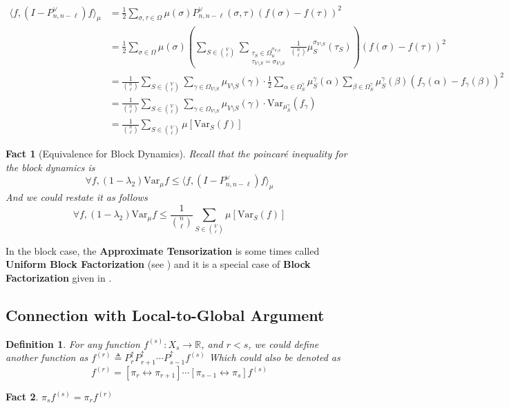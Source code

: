 \documentclass{article}
\newtheorem{define}{Definition}[section]
\newtheorem{fact}{Fact}[section]
\def\<{\langle}
\def\>{\rangle}
\def\Var{\mathrm{Var}}
\begin{document}
\begin{align*}
  \<f, (I - P^{\lor}_{n,n-\ell})f\>_\mu
  &= \frac{1}{2} \sum_{\sigma, \tau \in\Omega} \mu(\sigma)P^\lor_{n,n-\ell}(\sigma, \tau)\left(f(\sigma) - f(\tau)\right)^2 \\
  &= \frac{1}{2} \sum_{\sigma\in\Omega} \mu(\sigma) \left(\sum_{S \in \binom{V}{\ell}} \sum_{\substack{\tau_S\in\Omega^{\sigma_{V\setminus S}}_u \\ \tau_{V\setminus S} = \sigma_{V\setminus S}}} \frac{1}{\binom{n}{\ell}} \mu^{\sigma_{V\setminus S}}_S(\tau_S)\right)\left(f(\sigma) - f(\tau)\right)^2 \\
  &= \frac{1}{\binom{n}{\ell}} \sum_{S\in \binom{V}{\ell}} \sum_{\gamma\in \Omega_{V\setminus S}} \mu_{V\setminus S} (\gamma) \cdot \frac{1}{2} \sum_{\alpha\in \Omega^{\gamma}_S} \mu^\gamma_S(\alpha) \sum_{\beta\in\Omega^\gamma_S}\mu^\gamma_S(\beta) (f_\gamma(\alpha) - f_\gamma(\beta))^2 \\
  &= \frac{1}{\binom{n}{\ell}}\sum_{S\in \binom{V}{\ell}} \sum_{\gamma\in\Omega_{V\setminus S}} \mu_{V\setminus S}(\gamma) \cdot \Var_{\mu^\gamma_S} (f_\gamma) \\
  &= \frac{1}{\binom{n}{\ell}} \sum_{S\in \binom{V}{\ell}} \mu\left[\Var_S(f)\right]
\end{align*}

\begin{fact}[Equivalence for Block Dynamics]
  Recall that the poincar{\'e} inequality for the block dynamics is
  \[\forall f, (1 - \lambda_2) \Var_\mu f \leq \<f, (I - P^\lor_{n,n-\ell})f\>_\mu\]
  And we could restate it as follows
  \[\forall f, (1 - \lambda_2) \Var_\mu f \leq \frac{1}{\binom{n}{\ell}} \sum_{S\in\binom{V}{\ell}} \mu[\Var_S(f)]\]
\end{fact}

In the block case, the \textbf{Approximate Tensorization} is some times called \textbf{Uniform Block Factorization} (see \cite{CLV20-1}) and it is a special case of \textbf{Block Factorization} given in \cite{caputo2020block}.

\subsection{Connection with Local-to-Global Argument}

\begin{define}
  For any function $f^{(s)}: X_s \to \mathbb{R}$, and $r < s$, we could define another function as
  $f^{(r)} \triangleq P_r^\uparrow P_{r+1}^\uparrow\cdots P_{s-1}^\uparrow f^{(s)}$
  Which could also be denoted as
  \[f^{(r)} = [\pi_r \leftrightarrow \pi_{r+1}] \cdots [\pi_{s-1} \leftrightarrow \pi_s]f^{(s)}\]
\end{define}
\begin{fact}
  $\pi_s f^{(s)} = \pi_r f^{(r)}$
\end{fact}
\end{document}
